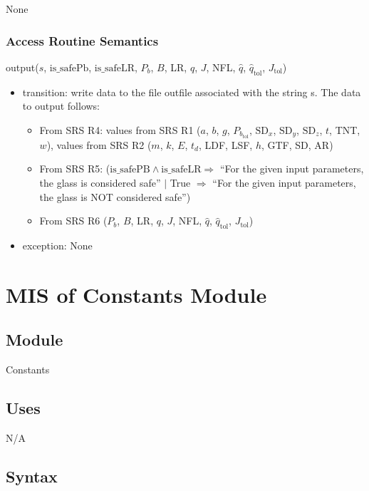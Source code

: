 \documentclass[12pt, titlepage]{article}
\begin{document}
None

\subsubsection {Access Routine Semantics}

\noindent output($s$, $\mbox{is\_safePb}$, $\mbox{is\_safeLR}$, $P_b$, $B$, 
LR, $q$, $J$, NFL, $\hat{q}$, $\hat{q}_{\text{tol}}$, $J_{\text{tol}}$)

\begin{itemize}
\item transition: write data to the file outfile associated with the string s.
  The data to output follows:
\begin{itemize}
\item From SRS R4: values from SRS R1 ($a$, $b$, $g$, $P_{b_\text{tol}}$, $\mbox{SD}_x$,
  $\mbox{SD}_y$, $\mbox{SD}_z$, $t$, TNT, $w$), values from SRS R2 ($m$, $k$, $E$,
  $t_d$, LDF, LSF, $h$, GTF, SD, AR)
\item From SRS R5: ($\mbox{is\_safePB} \wedge \mbox{is\_safeLR}
  \Rightarrow$ ``For the given input parameters, the glass is considered safe''
 $ |$ True $\Rightarrow$ ``For the given input parameters, the glass is NOT
 considered safe'') 
\item From SRS R6 ($P_b$, $B$, LR, $q$, $J$, NFL, $\hat{q}$, $\hat{q}_{\text{tol}}$, $J_{\text{tol}}$)
\end{itemize}
\item exception: None
\end{itemize}

\newpage


\section{MIS of Constants Module} \label{Constants}

\subsection{Module}

Constants

\subsection {Uses}

N/A

\subsection {Syntax}
\end{document}
